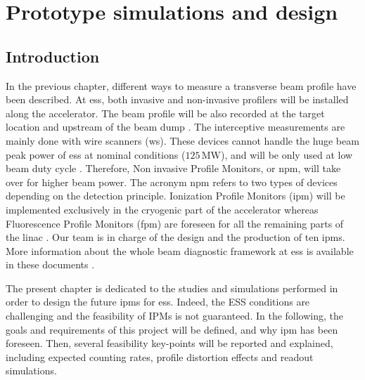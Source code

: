 \chapter{Prototype simulations and design}
\cleardoublepage
\minitoc
\section{Introduction}
\begin{refsection}
	\label{ch3:Introduction}
	In the previous chapter, different ways to measure a transverse beam profile have been described. At \acrshort{ess}, both invasive and non-invasive profilers will be installed along the accelerator. The beam profile will be also recorded at the target location and upstream of the beam dump \cite{shea2013}. The interceptive measurements are mainly done with wire scanners (\acrshort{ws}). These devices cannot handle the huge beam peak power of \acrshort{ess} at nominal conditions ($125\,\mathrm{MW}$), and will be only used at low beam duty cycle \cite{Cheymol2013}. Therefore, Non invasive Profile Monitors, or \acrshort{npm}, will take over for higher beam power. The acronym \acrshort{npm} refers to two types of devices depending on the detection principle. Ionization Profile Monitors (\acrshort{ipm}) will be implemented exclusively in the cryogenic part of the accelerator whereas Fluorescence Profile Monitors (\acrshort{fpm}) are foreseen for all the remaining parts of the linac \cite{Thomas2016}. Our team is in charge of the design and the production of ten \acrshort{ipm}s. More information about the whole beam diagnostic framework at \acrshort{ess} is available in these documents \cite{Peggs2013,Shea:IBIC2017-MO2AB2}.

	The present chapter is dedicated to the studies and simulations performed in order to design the future \acrshort{ipm}s for \acrshort{ess}. Indeed, the ESS conditions are challenging and the feasibility of IPMs is not guaranteed. In the following, the goals and requirements of this project will be defined, and why \acrshort{ipm} has been foreseen. Then, several feasibility key-points will be reported and explained, including expected counting rates, profile distortion effects and readout simulations.


\end{refsection}
